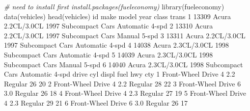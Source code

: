 \documentclass[
]{book}
\newenvironment{Shaded}{\begin{snugshade}}{\end{snugshade}}
\newcommand{\CommentTok}[1]{\textcolor[rgb]{0.56,0.35,0.01}{\textit{#1}}}
\newcommand{\DecValTok}[1]{\textcolor[rgb]{0.00,0.00,0.81}{#1}}
\newcommand{\FloatTok}[1]{\textcolor[rgb]{0.00,0.00,0.81}{#1}}
\newcommand{\FunctionTok}[1]{\textcolor[rgb]{0.00,0.00,0.00}{#1}}
\newcommand{\NormalTok}[1]{#1}
\newcommand{\SpecialCharTok}[1]{\textcolor[rgb]{0.00,0.00,0.00}{#1}}
\begin{document}
\begin{Shaded}
\begin{Highlighting}[]
\CommentTok{\# need to install first install.packages(\textquotesingle{}fueleconomy\textquotesingle{})}
\FunctionTok{library}\NormalTok{(fueleconomy)}
\FunctionTok{data}\NormalTok{(vehicles)}
\FunctionTok{head}\NormalTok{(vehicles)}
\NormalTok{     id  make       model year           class           trans}
\DecValTok{1} \DecValTok{13309}\NormalTok{ Acura }\FloatTok{2.2}\NormalTok{CL}\SpecialCharTok{/}\FloatTok{3.0}\NormalTok{CL }\DecValTok{1997}\NormalTok{ Subcompact Cars Automatic }\DecValTok{4}\SpecialCharTok{{-}}\NormalTok{spd}
\DecValTok{2} \DecValTok{13310}\NormalTok{ Acura }\FloatTok{2.2}\NormalTok{CL}\SpecialCharTok{/}\FloatTok{3.0}\NormalTok{CL }\DecValTok{1997}\NormalTok{ Subcompact Cars    Manual }\DecValTok{5}\SpecialCharTok{{-}}\NormalTok{spd}
\DecValTok{3} \DecValTok{13311}\NormalTok{ Acura }\FloatTok{2.2}\NormalTok{CL}\SpecialCharTok{/}\FloatTok{3.0}\NormalTok{CL }\DecValTok{1997}\NormalTok{ Subcompact Cars Automatic }\DecValTok{4}\SpecialCharTok{{-}}\NormalTok{spd}
\DecValTok{4} \DecValTok{14038}\NormalTok{ Acura }\FloatTok{2.3}\NormalTok{CL}\SpecialCharTok{/}\FloatTok{3.0}\NormalTok{CL }\DecValTok{1998}\NormalTok{ Subcompact Cars Automatic }\DecValTok{4}\SpecialCharTok{{-}}\NormalTok{spd}
\DecValTok{5} \DecValTok{14039}\NormalTok{ Acura }\FloatTok{2.3}\NormalTok{CL}\SpecialCharTok{/}\FloatTok{3.0}\NormalTok{CL }\DecValTok{1998}\NormalTok{ Subcompact Cars    Manual }\DecValTok{5}\SpecialCharTok{{-}}\NormalTok{spd}
\DecValTok{6} \DecValTok{14040}\NormalTok{ Acura }\FloatTok{2.3}\NormalTok{CL}\SpecialCharTok{/}\FloatTok{3.0}\NormalTok{CL }\DecValTok{1998}\NormalTok{ Subcompact Cars Automatic }\DecValTok{4}\SpecialCharTok{{-}}\NormalTok{spd}
\NormalTok{              drive cyl displ    fuel hwy cty}
\DecValTok{1}\NormalTok{ Front}\SpecialCharTok{{-}}\NormalTok{Wheel Drive   }\DecValTok{4}   \FloatTok{2.2}\NormalTok{ Regular  }\DecValTok{26}  \DecValTok{20}
\DecValTok{2}\NormalTok{ Front}\SpecialCharTok{{-}}\NormalTok{Wheel Drive   }\DecValTok{4}   \FloatTok{2.2}\NormalTok{ Regular  }\DecValTok{28}  \DecValTok{22}
\DecValTok{3}\NormalTok{ Front}\SpecialCharTok{{-}}\NormalTok{Wheel Drive   }\DecValTok{6}   \FloatTok{3.0}\NormalTok{ Regular  }\DecValTok{26}  \DecValTok{18}
\DecValTok{4}\NormalTok{ Front}\SpecialCharTok{{-}}\NormalTok{Wheel Drive   }\DecValTok{4}   \FloatTok{2.3}\NormalTok{ Regular  }\DecValTok{27}  \DecValTok{19}
\DecValTok{5}\NormalTok{ Front}\SpecialCharTok{{-}}\NormalTok{Wheel Drive   }\DecValTok{4}   \FloatTok{2.3}\NormalTok{ Regular  }\DecValTok{29}  \DecValTok{21}
\DecValTok{6}\NormalTok{ Front}\SpecialCharTok{{-}}\NormalTok{Wheel Drive   }\DecValTok{6}   \FloatTok{3.0}\NormalTok{ Regular  }\DecValTok{26}  \DecValTok{17}
\end{Highlighting}
\end{Shaded}
\end{document}
